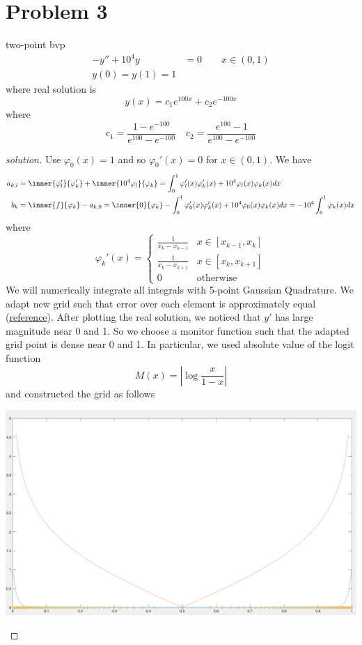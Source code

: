 \documentclass[11pt]{article}
\begin{document}
\section*{Problem 3} two-point bvp
\begin{align*}
    -y'' + 10^4 y &= 0 \quad \quad x\in(0,1) \\
    y(0) = y(1) = 1
\end{align*}
where real solution is 
\[
    y(x) = c_1 e^{100x} + c_2 e^{-100x}    
\]
where 
\[
    c_1 = \frac{1-e^{-100}}{e^100-e^{-100}}
    \quad 
    c_2 = \frac{e^100-1}{e^100-e^{-100}}
\]
\begin{proof}[solution]
    Use $\varphi_0(x) = 1$ and so $\varphi_0'(x) = 0$ for $x\in(0,1)$. We have
    \begin{align*}
        a_{k,l} 
            &= \inner{\varphi_l'}{\varphi_k'} + \inner{10^4\varphi_l}{\varphi_k} 
            = \int_0^1 \varphi_l'(x)\varphi_k'(x) + 10^4\varphi_l(x)\varphi_k(x) dx  \\
        b_k &= \inner{f}{\varphi_k} - a_{k,0} 
            = \inner{0}{\varphi_k} -\int_0^1 \varphi_0'(x)\varphi_k'(x) + 10^4 \varphi_0(x) \varphi_k(x) dx 
            = -10^4 \int_0^1 \varphi_k(x) dx
    \end{align*}
    where 
    \[
        \varphi_k'(x) = 
        \begin{cases}
            \frac{1}{x_k-x_{k-1}} & x\in [x_{k-1}, x_k] \\
            \frac{1}{x_k-x_{k+1}} & x\in [x_{k}, x_{k+1}] \\
            0 & \text{otherwise}
        \end{cases}
    \]
    We will numerically integrate all integrals with 5-point Gaussian Quadrature. We adapt new grid such that error over each element is approximately equal (\href{https://www.math.uci.edu/~chenlong/226/Ch4AFEM.pdf}{reference}). After plotting the real solution, we noticed that $y'$ has large magnitude near 0 and 1. So we choose a monitor function such that the adapted grid point is dense near 0 and 1. In particular, we used absolute value of the logit function 
    \[
        M(x) = \left| \log \frac{x}{1-x} \right|
    \]
    and constructed the grid as follows
    \begin{center}
        \includegraphics[width=\textwidth]{logit_matlab} 

\end{center}
\end{proof}
\end{document}
